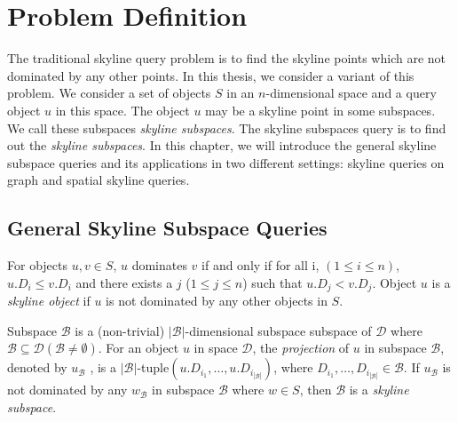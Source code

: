
%
%

\chapter{Problem Definition}
\label{ch:prob-def}

The traditional skyline query problem is to find the skyline points which are not dominated by any other points. In this thesis, we consider a variant of this problem. We consider a set of objects $S$ in an $n$-dimensional space and a query object $u$ in this space. The object $u$ may be a skyline point in some subspaces. We call these subspaces \emph{skyline subspaces}. The skyline subspaces query is to find out the \emph{skyline subspaces}. In this chapter, we will introduce the general skyline subspace queries and its applications in two different settings: skyline queries on graph and spatial skyline queries.

\section{General Skyline Subspace Queries}

\begin{definition}[Skyline]
For objects $u, v \in S$, $u$ dominates $v$ if and only if for all i, $(1 \leq i \leq n)$, $u.D_i \leq v.D_i$ and there exists a $j$ ($1 \leq j \leq n$) such that $u.D_j < v.D_j$. Object $u$ is a \emph{skyline object} if $u$ is not dominated by any other objects in $S$.
\end{definition}

\begin{definition}
Subspace $\mathcal{B}$ is a (non-trivial) $|\mathcal{B}|$-dimensional subspace subspace of $\mathcal{D}$ 
where $\mathcal{B}\subseteq \mathcal{D} (\mathcal{B}\neq\emptyset)$.
For an object $u$ in space $\mathcal{D}$, 
the \emph{projection} of $u$ in subspace $\mathcal{B}$, denoted by $u_\mathcal{B}$
, is a $|\mathcal{B}|$-tuple$(u.D_{i_1},\dots,u.D_{i_{|\mathcal{B}|}})$,
where $D_{i_1},\dots,D_{i_{|\mathcal{B}|}} \in \mathcal{B}$.
If $u_\mathcal{B}$ is not dominated by any $w_\mathcal{B}$ in subspace $\mathcal{B}$ where $w \in S$, then $\mathcal{B}$ is a \emph{skyline subspace}.
\end{definition}

